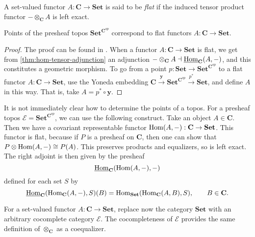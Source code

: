 \begin{definition}
\label{def:set valued flat functor}
A set-valued functor $A : \mathbf{C} \to \mathbf{Set}$ is said to be \emph{flat}  if the induced tensor product functor $- \otimes_{\mathbf{C}} A$ is left exact.
\end{definition}

\begin{theorem}
\label{thm:points of the presheaf topos correspond to flat functors to SET}
Points of the presheaf topos $\mathbf{Set}^{\mathbf{C}^{op}}$ correspond to flat functors $A : \mathbf{C} \to \mathbf{Set}$.
\end{theorem}
\begin{proof}
The proof can be found in \cite[Theorem VII.5.2]{MacLaneMoerdijk91}. When a functor $A : \mathbf{C} \to \mathbf{Set}$ is flat, we get from \cref{thm:hom-tensor-adjunction} an adjunction $- \otimes_{\mathbf{C}} A \dashv \underline{\operatorname{Hom}}_{\mathbf{C}}(A,-)$, and this constitutes a geometric morphism. To go from a point $p : \mathbf{Set} \to \mathbf{Set}^{\mathbf{C}^{op}}$ to a flat functor $A : \mathbf{C} \to \mathbf{Set}$, use the Yoneda embedding $\mathbf{C} \xrightarrow{\mathbf{y}} \mathbf{Set}^{\mathbf{C}^{op}} \xrightarrow{p^*} \mathbf{Set}$, and define $A$ in this way. That is, take $A = p^* \circ \mathbf{y}$.
\end{proof}

\begin{construction}
\label{constr:how to get points}
It is not immediately clear how to determine the points of a topos. For a presheaf topos $\mathscr{E} = \mathbf{Set}^{\mathbf{C}^{op}}$, we can use the following construct. Take an object $A \in \mathbf{C}$. Then we have a covariant representable functor $\operatorname{Hom}(A,-) : \mathbf{C} \to \mathbf{Set}$. This functor is flat, because if $P$ is a presheaf on $\mathbf{C}$, then one can show that $P \otimes \operatorname{Hom}(A,-) \cong P(A)$. This preserves products and equalizers, so is left exact. The right adjoint is then given by the presheaf
\[ \underline{\operatorname{Hom}}_{\mathbf{C}}(\operatorname{Hom}(A, -), -) \]
defined for each set $S$ by
\[ \underline{\operatorname{Hom}}_{\mathbf{C}}(\operatorname{Hom}_{\mathbf{C}}(A, -), S)(B) = \operatorname{Hom}_{\mathbf{Set}}(\operatorname{Hom}_{\mathbf{C}}(A,B), S), \qquad B \in \mathbf{C}. \]
\end{construction}

For a set-valued functor $A: \mathbf{C} \to \mathbf{Set}$, replace now the category $\mathbf{Set}$ with an arbitrary cocomplete category $\mathscr{E}$. The cocompleteness of $\mathscr{E}$ provides the same definition of $\otimes_{\mathbf{C}}$ as a coequalizer.

